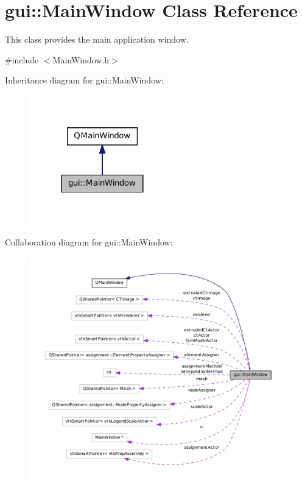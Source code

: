 \hypertarget{classgui_1_1_main_window}{
\section{gui::MainWindow Class Reference}
\label{classgui_1_1_main_window}
}


This class provides the main application window.  




{\ttfamily \#include $<$MainWindow.h$>$}



Inheritance diagram for gui::MainWindow:\nopagebreak
\begin{figure}[H]
\begin{center}
\leavevmode
\includegraphics[width=180pt]{classgui_1_1_main_window__inherit__graph}
\end{center}
\end{figure}


Collaboration diagram for gui::MainWindow:\nopagebreak
\begin{figure}[H]
\begin{center}
\leavevmode
\includegraphics[width=400pt]{classgui_1_1_main_window__coll__graph}
\end{center}
\end{figure}
